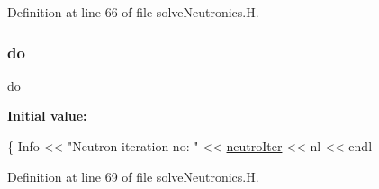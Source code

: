 Definition at line 66 of file solve\+Neutronics.\+H.

\mbox{\label{solveNeutronics_8H_a721c6ff80a6d3e4ad4ffa52a04c60085}} 
\subsubsection{\texorpdfstring{do}{do}}
{\footnotesize\ttfamily do}

{\bfseries Initial value\+:}
\begin{DoxyCode}
\{
    Info << \textcolor{stringliteral}{"Neutron iteration no:  "} << \hyperlink{solveNeutronics_8H_a5ea48e0170faff29dfdd3cbba330d51d}{neutroIter} << nl << endl
\end{DoxyCode}


Definition at line 69 of file solve\+Neutronics.\+H.

